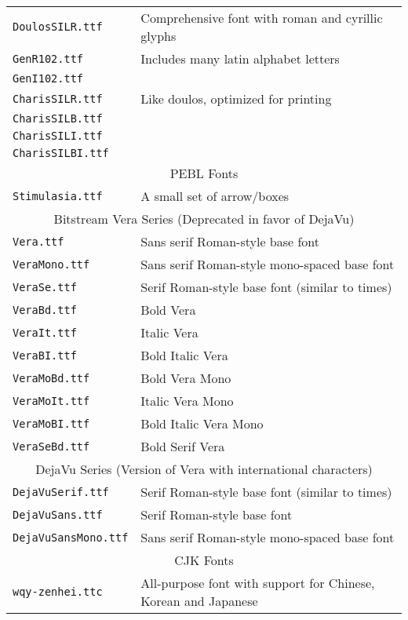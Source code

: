 \begin{table}[htbp]
\begin{tabular}{ll}
\texttt{DoulosSILR.ttf}&Comprehensive font with roman and cyrillic glyphs\\
\texttt{GenR102.ttf}& Includes many latin alphabet letters\\
\texttt{GenI102.ttf}& \\
\texttt{CharisSILR.ttf}& Like doulos, optimized for printing\\
\texttt{CharisSILB.ttf}&\\
\texttt{CharisSILI.ttf}& \\    
\texttt{CharisSILBI.ttf}& \\   
\midrule
\multicolumn{2}{c}{PEBL Fonts}\\
\texttt{Stimulasia.ttf}& A small set of arrow/boxes\\
\midrule
\multicolumn{2}{c}{Bitstream Vera Series (Deprecated in favor of DejaVu)}\\
\texttt{Vera.ttf}    &     Sans serif Roman-style base font\\
\texttt{VeraMono.ttf}&     Sans serif Roman-style mono-spaced base font\\
\texttt{VeraSe.ttf}  &     Serif Roman-style base font (similar to times)\\
\texttt{VeraBd.ttf}  &     Bold Vera\\
\texttt{VeraIt.ttf}  &     Italic Vera\\
\texttt{VeraBI.ttf}  &     Bold Italic Vera\\
\texttt{VeraMoBd.ttf}&     Bold Vera Mono\\
\texttt{VeraMoIt.ttf}&     Italic Vera Mono\\
\texttt{VeraMoBI.ttf}&     Bold Italic Vera Mono\\
\texttt{VeraSeBd.ttf}&     Bold Serif Vera\\
\midrule
\multicolumn{2}{c}{DejaVu Series (Version of Vera with
  international characters)}\\
\texttt{DejaVuSerif.ttf}    &     Serif Roman-style base font (similar to times)\\
\texttt{DejaVuSans.ttf}     &     Serif Roman-style base font\\
\texttt{DejaVuSansMono.ttf} &   Sans serif Roman-style mono-spaced base font\\
\midrule
\multicolumn{2}{c}{CJK Fonts}\\
\texttt{wqy-zenhei.ttc} & All-purpose font with support for Chinese, Korean and Japanese\\

\bottomrule
\end{tabular}
\label{tab:fonts}
\end{table}



